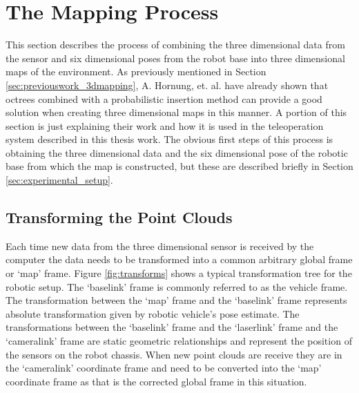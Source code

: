 \documentclass[12pt]{report}
\begin{document}
\section{The Mapping Process}
\label{sec:3dmapping}
This section describes the process of combining the three dimensional data from the sensor and six dimensional poses from the robot base into three dimensional maps of the environment. As previously mentioned in Section \ref{sec:previouswork_3dmapping}, A. Hornung, et. al. have already shown that octrees combined with a probabilistic insertion method can provide a good solution when creating three dimensional maps in this manner. A portion of this section is just explaining their work and how it is used in the teleoperation system described in this thesis work.\cite{octomap} The obvious first steps of this process is obtaining the three dimensional data and the six dimensional pose of the robotic base from which the map is constructed, but these are described briefly in Section \ref{sec:experimental_setup}.

\subsection{Transforming the Point Clouds}
Each time new data from the three dimensional sensor is received by the computer the data needs to be transformed into a common arbitrary global frame or `map' frame. Figure \ref{fig:transforms} shows a typical transformation tree for the robotic setup. The `base\textunderscore{}link' frame is commonly referred to as the vehicle frame. The transformation between the `map' frame and the `base\textunderscore{}link' frame represents absolute transformation given by robotic vehicle's pose estimate. The transformations between the `base\textunderscore{}link' frame and the `laser\textunderscore{}link' frame and the `camera\textunderscore{}link' frame are static geometric relationships and represent the position of the sensors on the robot chassis. When new point clouds are receive they are in the `camera\textunderscore{}link' coordinate frame and need to be converted into the `map' coordinate frame as that is the corrected global frame in this situation.
\end{document}
